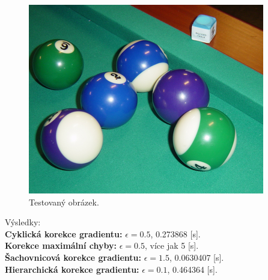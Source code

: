 \documentclass[11pt,a4paper,oneside]{article}
\begin{document}
	\begin{figure}[!htbp]
		\centering
		\includegraphics[scale=0.5]{../resources/images/balls.jpg}
		\caption{Testovaný obrázek.}
		\label{fig:in}
	\end{figure}

	Výsledky: \\
	\textbf{Cyklická korekce gradientu:} \;
	$\epsilon = 0.5$, 0.273868 [s]. \\
	\textbf{Korekce maximální chyby:} \;
	$\epsilon = 0.5$, více jak 5 [s]. \\
	\textbf{Šachovnicová korekce gradientu:} \;
	$\epsilon = 1.5$, 0.0630407 [s]. \\
	\textbf{Hierarchická korekce gradientu:} \;
	$\epsilon = 0.1$, 0.464364 [s]. \\
\end{document}
